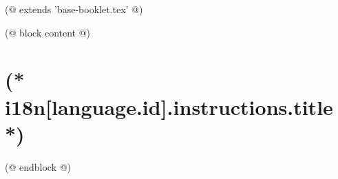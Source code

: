 (@ extends 'base-booklet.tex' @)

(@ block content @)
    \pagestyle{instructions}

    \section{(* i18n[language.id].instructions.title *)}
    
(@ endblock @)
